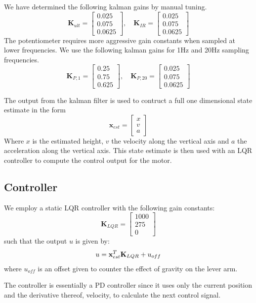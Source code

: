 We have determined the following kalman gains by manual tuning.
\begin{equation*}
	\mathbf{K}_{ult} = \begin{bmatrix}
		0.025 \\
		0.075 \\
		0.0625
	\end{bmatrix}, \quad
	\mathbf{K}_{IR} = \begin{bmatrix}
		0.025 \\
		0.075 \\
		0.0625
	\end{bmatrix}
\end{equation*}
The potentiometer requires more aggressive gain constants when sampled at lower frequencies. We use the following kalman gains for 1Hz
and 20Hz sampling frequencies. 
\begin{equation*}
	\mathbf{K}_{P,1} = \begin{bmatrix}
		0.25 \\
		0.75 \\
		0.625 
	\end{bmatrix},\quad
	\mathbf{K}_{P,20} = \begin{bmatrix}
		0.025 \\
		0.075 \\
		0.0625
	\end{bmatrix}
\end{equation*}

The output from the kalman filter is used to contruct a full one dimensional state estimate in the form
\begin{equation*}
	{\mathbf{x}}_{est} = \begin{bmatrix}
		x \\
		v \\
		a
	\end{bmatrix}
\end{equation*}
Where \(x\) is the estimated height, \(v\) the velocity along the vertical axis and \(a\) the acceleration along the vertical axis. 
This state estimate is then used with an LQR controller to compute the control output for the motor.
\subsection{Controller}\label{sec:controller}
We employ a static LQR controller with the following gain constants:
\begin{equation*}
	\mathbf{K}_{LQR} = \begin{bmatrix}
		1000 \\
		275 \\
		0 
	\end{bmatrix}
\end{equation*}
such that the output $u$ is given by:
\begin{equation*}
u = \mathbf x _{est}^{\mbox T}\mathbf K_{LQR} + u_{off}
\end{equation*}
where $u_{off}$ is an offset given to counter the effect of gravity on the lever
arm.

The controller is essentially a PD controller since it uses only the current position and the derivative thereof, velocity, to calculate
the next control signal.
